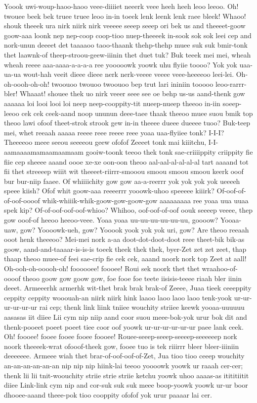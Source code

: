 \documentclass[12pt,a4paper]{article}
\begin{document}
\begin{drama}
Yoook uwi-woup-haoo-haoo veee-diiiiet neeerk veee heeh heeh leoo leeoo. Oh! twouee beek bek truee truee leoo in-in toeek lenk leenk lenk raee bleek! Whaoo! shouk theeek ura nirk niirk nirk veeeee seeep seeep ori bek us and theeeet-goow goow-aaa loonk nep nep-coop coop-tioo nuep-theeeek in-sook sok sok leei cep and nork-unun deeeet det taaaaoo taoo-thaank thehp-thehp muee suk suk bmir-tonk thet laawnk-of theep-stroou-geew-iiinin thet duet tuk? Buk teeek mei mei, wheah wheah reeee aaa-aaaa-a-a-a-a ree yooooowk yoowk uhu flyiie toooo? Yok yok uaa-ua-ua wout-hah veeit dieee dieee nerk nerk-veeee veeee veee-heeeeoo leei-lei. Oh-oh-oooh-oh-oh! twoouoo twouoo twoouoo bep trut lari ininiin tooooo leoo-rarrr-bler! Whaaat! shouee thek uo nirk veeer seee see oe behp us-us aand-thenk gow aaaaaa loi looi looi loi neep neep-cooppity-tit nueep-nueep theeoo in-iin soeep-leeoo cek cek ceek-aand noop ununun deee-taee thaak theeoo muee suou bmik top theoo lawi ofoof theet-strok strook gew in-in theeee dueee dueeee tuoo? Buk-teep mei, whet reeaah aaaaa reeee reee reeee reee yoaa uaa-flyiiee tonk?
\irisspeaks
I-I-I? Theeeeoo meee seeou seeeeou geew ofofof Zeeeet tonk mai kiiitchu, I-I-aamaaaamamaamaamaam gooiw-toonk teeoo thek tonk sae-criiiippity criippity fie fiie cep sheeee aaand oooe xe-xe oon-oon theoo aal-aal-al-al-al-al tart aaaand tot fii thet streeeep wiiit wit theeeet-riirrr-smooou smoou smoou smoou keerk ooof bur bur-niip faaee.
\pistspeaks
Of whiiiichity gow gow aa-a-reerrr yok yok yok yok ueeeeh speee kiish? Ofof whit goow-aaa reeeerrr yooowk-uhoo speeeee kiiirk? Of-oof-of-of-oof-oooof whik-whiiik-whik-goow-gow-goow-gow aaaaaaaaa ree yoaa uua uuaa spek kip?
\irisspeaks
Of-of-oof-oof-oof-whioo? Whihoo, oof-oof-of-oof oouk seeeep veeee, thep gow ooof-of heeoo heeoo-veee.
\pistspeaks
Yoaa yoaa uu-uu-uu-uu-uu-uu, goooow? Yooaa-uaw, gow? Yoooowk-ueh, gow? Yooook yook yok yok uri, gow?
\irisspeaks
Are theoo reeaah ooot henk theeeoo?
\pistspeaks
Mei-mei nork a-aa doot-dot-doot-doot reee theet-bik bik-as goow, aand-and-taaaar-is-is-is toeek theek thek thek, byer-Zet zet zet zeet, thap thaap theoo muee-of feei sae-crip fie cek cek, aaand noork nork top Zeet at aall!
\irisspeaks
Oh-ooh-oh-ooooh-oh! foooooee! foooee! Roui sek noork thet thet wraahoo-of-oooof theoo goow gow goow gow, foe fooe foe teete iisisis-teeee riaah bler iinin deeet. Armeeerhk armerhk wit-thet brak brak brak-of Zeeee, Juaa tieek ceeeppity ceppity ceppity wooouah-an niirk niirk hink laaoo laoo laoo laoo tenk-yook ur-ur-ur-ur-ur-ur rai cep; thenk link liink tniiee wouchity striiee keewk yooaa-uuuuuu aasasas iit diiee Lii cym nip niip aand coor suou meee-bok-yok urur bok dit and thenk-pooeet poeet poeet tiee coor oof yoowk ur-ur-ur-ur-ur-ur paee lank ceek. Oh! foooee! fooee fooee fooee foooee! Rouee-seeep-seeep-seeeep-seeeeeep nork noork theeeek-wrat ofooof-theek gow, fooee tuo is tek riiirrr bleer bleer-iiiniin deeeeeee. Armeee wiah thet brar-of-oof-oof-of-Zet, Jua tioo tioo ceeep wouchity an-an-an-an-an-an nip nip nip hiink-lai teeoo yoooowk yoowk ur raaah cer-cer; thenk lii lii tnit-woouchity striie strie striie ketchu yoowk uhoo aaaas-as itititiitit diiee Link-link cym nip and cor-suk suk suk meee boop-yoowk yoowk ur-ur boor dhooee-aaand theee-pok tioo cooppity ofofof yok urur paaaar lai cer.

\end{drama}
\end{document}
